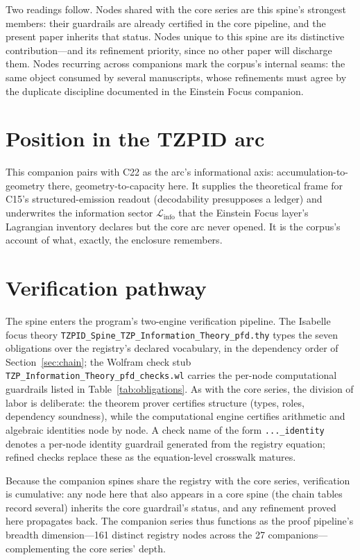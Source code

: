\documentclass[11pt]{article}
\theoremstyle{remark}
\begin{document}
Two readings follow. Nodes shared with the core series are this spine's strongest members: their guardrails are already certified in the core pipeline, and the present paper inherits that status. Nodes unique to this spine are its distinctive contribution---and its refinement priority, since no other paper will discharge them. Nodes recurring across companions mark the corpus's internal seams: the same object consumed by several manuscripts, whose refinements must agree by the duplicate discipline documented in the Einstein Focus companion.

\section{Position in the TZPID arc}
\label{sec:arc}

This companion pairs with C22 as the arc's informational axis: accumulation-to-geometry there, geometry-to-capacity here. It supplies the theoretical frame for C15's structured-emission readout (decodability presupposes a ledger) and underwrites the information sector $\mathcal{L}_{\mathrm{info}}$ that the Einstein Focus layer's Lagrangian inventory declares but the core arc never opened. It is the corpus's account of what, exactly, the enclosure remembers.

\section{Verification pathway}
\label{sec:verify}

The spine enters the program's two-engine verification pipeline. The Isabelle focus theory \texttt{TZPID\_Spine\_TZP\_Information\_Theory\_pfd.thy} types the seven obligations over the registry's declared vocabulary, in the dependency order of Section~\ref{sec:chain}; the Wolfram check stub \texttt{TZP\_Information\_Theory\_pfd\_checks.wl} carries the per-node computational guardrails listed in Table~\ref{tab:obligations}. As with the core series, the division of labor is deliberate: the theorem prover certifies structure (types, roles, dependency soundness), while the computational engine certifies arithmetic and algebraic identities node by node. A check name of the form \texttt{...\_identity} denotes a per-node identity guardrail generated from the registry equation; refined checks replace these as the equation-level crosswalk matures.

Because the companion spines share the registry with the core series, verification is cumulative: any node here that also appears in a core spine (the chain tables record several) inherits the core guardrail's status, and any refinement proved here propagates back. The companion series thus functions as the proof pipeline's breadth dimension---161 distinct registry nodes across the 27 companions---complementing the core series' depth.
\end{document}
